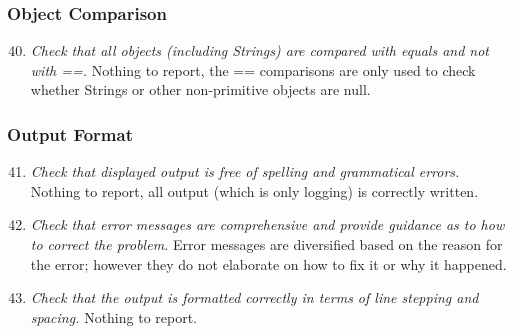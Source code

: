 	\subsubsection{Object Comparison}
		\begin{enumerate}
			\setcounter{enumi}{39}
			\item \textit{Check that all objects (including Strings) are compared with equals and not with ==.}\newline
			Nothing to report, the == comparisons are only used to check whether Strings or other non-primitive objects are null. 

		\end{enumerate}

	\subsubsection{Output Format}
		\begin{enumerate}
			\setcounter{enumi}{40}
			\item \textit{Check that displayed output is free of spelling and grammatical errors.}\newline
			Nothing to report, all output (which is only logging) is correctly written.
			
			\item \textit{Check that error messages are comprehensive and provide guidance as to how to correct the problem.}\newline
			Error messages are diversified based on the reason for the error; however they do not elaborate on how to fix it or why it happened.

			\item \textit{Check that the output is formatted correctly in terms of line stepping and spacing.}\newline
			Nothing to report. %
			
		\end{enumerate}

